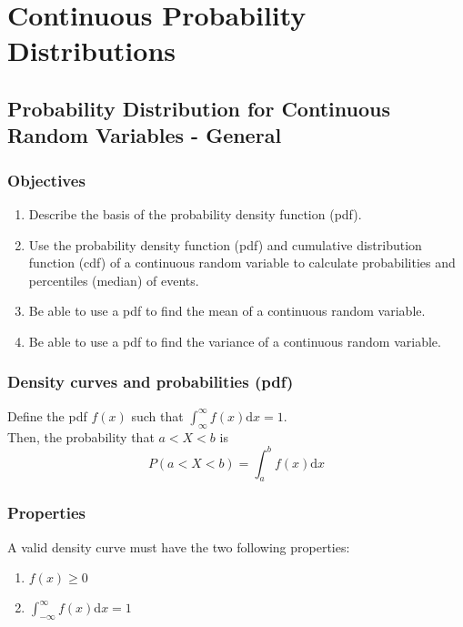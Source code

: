 \chapter{Continuous Probability Distributions}  %

\section{Probability Distribution for Continuous Random Variables - General}  %
\subsection*{Objectives}
\begin{enumerate}
    \item Describe the basis of the probability density function (pdf).
    \item Use the probability density function (pdf) and cumulative distribution function (cdf) of a continuous random variable to calculate probabilities and percentiles (median) of events.
    \item Be able to use a pdf to find the mean of a continuous random variable.
    \item Be able to use a pdf to find the variance of a continuous random variable.
\end{enumerate}

\subsection{Density curves and probabilities (pdf)}  %
Define the pdf $f(x)$ such that $\int_\infty^\infty f(x)\mathrm{d}x=1$. \\
Then, the probability that $a < X < b$ is
\[P(a<X<b)=\int_a^bf(x)\mathrm{d}x\]

\subsection{Properties}  %
A valid density curve must have the two following properties:
\begin{enumerate}
    \item $f(x)\geq 0$
    \item $\int_{-\infty}^\infty f(x)$d$x=1$
\end{enumerate}
\\

